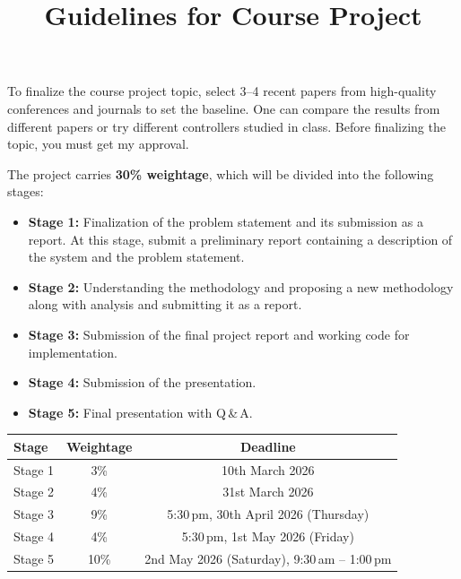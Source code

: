\documentclass[12pt, a4paper]{article}
\title{\textbf{Guidelines for Course Project}}
\date{}
\begin{document}
\maketitle
\thispagestyle{empty}

To finalize the course project topic, select 3--4 recent papers from high-quality conferences
and journals to set the baseline. One can compare the results from different papers or try
different controllers studied in class. Before finalizing the topic, you must get my approval.

The project carries \textbf{30\% weightage}, which will be divided into the following stages:

\begin{itemize}[leftmargin=1.5em]
    \item \textbf{Stage 1:} Finalization of the problem statement and its submission as a report. At
    this stage, submit a preliminary report containing a description of the system and
    the problem statement.

    \item \textbf{Stage 2:} Understanding the methodology and proposing a new methodology along
    with analysis and submitting it as a report.

    \item \textbf{Stage 3:} Submission of the final project report and working code for implementation.

    \item \textbf{Stage 4:} Submission of the presentation.

    \item \textbf{Stage 5:} Final presentation with Q\,\&\,A.
\end{itemize}

\vspace{1em}

\begin{center}
\begin{tabular}{@{}lcc@{}}
\toprule
\textbf{Stage} & \textbf{Weightage} & \textbf{Deadline} \\
\midrule
Stage 1 & 3\%  & 10th March 2026 \\
Stage 2 & 4\%  & 31st March 2026 \\
Stage 3 & 9\%  & 5:30\,pm, 30th April 2026 (Thursday) \\
Stage 4 & 4\%  & 5:30\,pm, 1st May 2026 (Friday) \\
Stage 5 & 10\% & 2nd May 2026 (Saturday), 9:30\,am -- 1:00\,pm \\
\bottomrule
\end{tabular}
\end{center}
\end{document}
